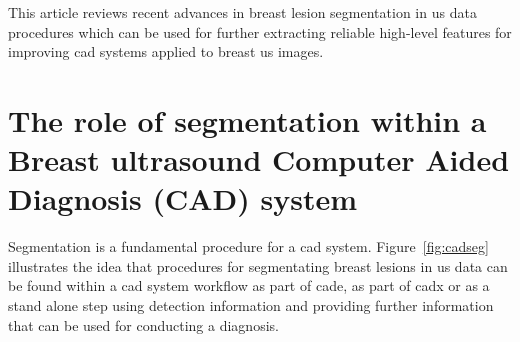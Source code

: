 \documentclass[authoryear,preprint,review,12pt]{elsarticle}
\begin{document}
This article reviews recent advances in breast lesion segmentation in \ac{us} data procedures which can be used for further extracting reliable high-level features for improving \ac{cad} systems applied to breast \ac{us} images.
%
%
%
%

\section[The role of segmentation in breast US CAD system]{The role of segmentation within a Breast ultrasound Computer Aided Diagnosis (CAD) system}\label{section:userInteraction}

Segmentation is a fundamental procedure for a \ac{cad} system. Figure~\ref{fig:cadseg} illustrates the idea that procedures for segmentating breast lesions in \ac{us} data can be found within a \ac{cad} system workflow as part of \ac{cade}, as part of \ac{cadx} or as a stand alone step using detection information and providing further information that can be used for conducting a diagnosis. 
\end{document}
